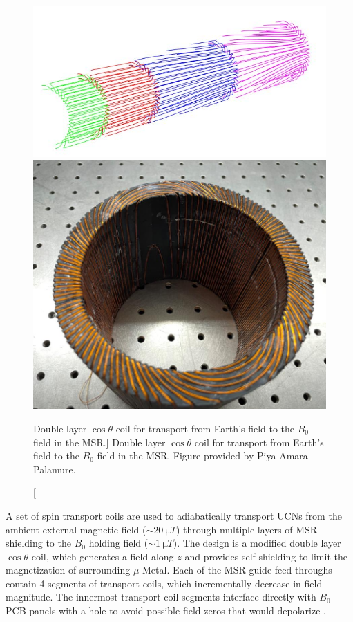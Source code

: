 \begin{figure}
\centering
\begin{minipage}{.5\textwidth}
    \centering
    \includegraphics[width=\textwidth]{figures/transport_coil_mockup.jpg}
\end{minipage}%
\begin{minipage}{.5\textwidth}
    \centering
    \includegraphics[width=\textwidth]{figures/transport_coil.jpg}
\end{minipage}
    \caption
    [Double layer $\cos\theta$ coil for transport from Earth's field to the $B_0$ field in the MSR.]
    {Double layer $\cos\theta$ coil for transport from Earth's field to the $B_0$ field in the MSR. Figure provided by Piya Amara Palamure.}
    \label{fig:transport-coils}
\end{figure}

A set of spin transport coils are used to adiabatically transport UCNs from the ambient external magnetic field ($\sim\qty{20}{\micro T}$) through multiple layers of MSR shielding to the $B_0$ holding field ($\sim\qty{1}{\micro T}$). The design is a modified double layer $\cos\theta$ coil, which generates a field along $z$ and provides self-shielding to limit the magnetization of surrounding $\mu$-Metal. Each of the MSR \ucn guide feed-throughs contain 4 segments of transport coils, which incrementally decrease in field magnitude. The innermost transport coil segments interface directly with $B_0$ PCB panels with a hole to avoid possible field zeros that would depolarize \ucn. 

